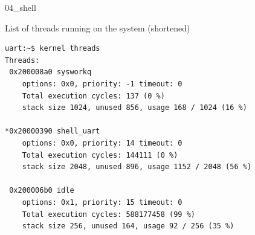 \documentclass[10pt, aspectratio=169]{beamer}
\begin{document}
\begin{frame}[fragile]{04\_shell}

\begin{exampleblock}{List of threads running on the system (shortened)}

    {\fontsize{7}{9.6}\selectfont
      \begin{verbatim}
uart:~$ kernel threads 
Threads:
 0x200008a0 sysworkq  
	options: 0x0, priority: -1 timeout: 0
	Total execution cycles: 137 (0 %)
	stack size 1024, unused 856, usage 168 / 1024 (16 %)

*0x20000390 shell_uart
	options: 0x0, priority: 14 timeout: 0
	Total execution cycles: 144111 (0 %)
	stack size 2048, unused 896, usage 1152 / 2048 (56 %)

 0x200006b0 idle
	options: 0x1, priority: 15 timeout: 0
	Total execution cycles: 588177458 (99 %)
	stack size 256, unused 164, usage 92 / 256 (35 %)
      \end{verbatim}
    }
  \end{exampleblock}

\end{frame}
\end{document}

